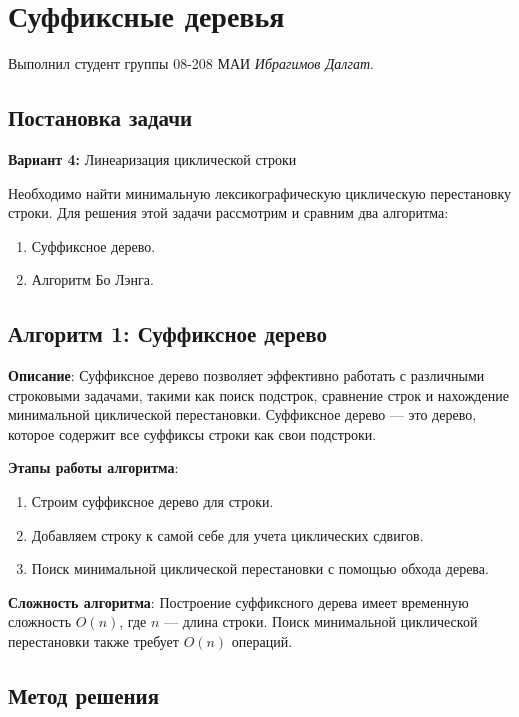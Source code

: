 \documentclass[12pt]{article}
\begin{document}
\section*{Суффиксные деревья}

\noindent Выполнил студент группы 08-208 МАИ \textit{Ибрагимов Далгат}.

\subsection*{Постановка задачи}

\textbf{Вариант 4:} Линеаризация циклической строки

\text Необходимо найти минимальную лексикографическую циклическую перестановку строки. Для решения этой задачи рассмотрим и сравним два алгоритма:
\begin{enumerate}
    \item Суффиксное дерево.
    \item Алгоритм Бо Лэнга.
\end{enumerate}


\subsection*{Алгоритм 1: Суффиксное дерево}

\textbf{Описание}: Суффиксное дерево позволяет эффективно работать с различными строковыми задачами, такими как поиск подстрок, сравнение строк и нахождение минимальной циклической перестановки. Суффиксное дерево — это дерево, которое содержит все суффиксы строки как свои подстроки.

\textbf{Этапы работы алгоритма}:
\begin{enumerate}
    \item Строим суффиксное дерево для строки.
    \item Добавляем строку к самой себе для учета циклических сдвигов.
    \item Поиск минимальной циклической перестановки с помощью обхода дерева.
\end{enumerate}

\textbf{Сложность алгоритма}: Построение суффиксного дерева имеет временную сложность $O(n)$, где $n$ — длина строки. Поиск минимальной циклической перестановки также требует $O(n)$ операций.
\subsection*{Метод решения}
\end{document}
